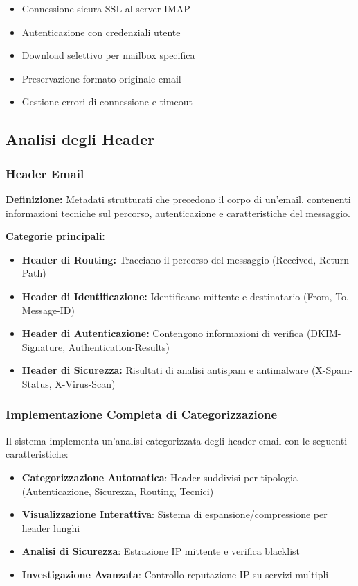 \documentclass{article}
\begin{document}
\begin{itemize}
    \item Connessione sicura SSL al server IMAP
    \item Autenticazione con credenziali utente
    \item Download selettivo per mailbox specifica
    \item Preservazione formato originale email
    \item Gestione errori di connessione e timeout
\end{itemize}

\subsection{Analisi degli Header}

\subsubsection{Header Email}
\textbf{Definizione:} Metadati strutturati che precedono il corpo di un'email, contenenti informazioni tecniche sul percorso, autenticazione e caratteristiche del messaggio.

\textbf{Categorie principali:}
\begin{itemize}
    \item \textbf{Header di Routing:} Tracciano il percorso del messaggio (Received, Return-Path)
    \item \textbf{Header di Identificazione:} Identificano mittente e destinatario (From, To, Message-ID)
    \item \textbf{Header di Autenticazione:} Contengono informazioni di verifica (DKIM-Signature, Authentication-Results)
    \item \textbf{Header di Sicurezza:} Risultati di analisi antispam e antimalware (X-Spam-Status, X-Virus-Scan)
\end{itemize}

\subsubsection{Implementazione Completa di Categorizzazione}

Il sistema implementa un'analisi categorizzata degli header email con le seguenti caratteristiche:

\begin{itemize}
    \item \textbf{Categorizzazione Automatica}: Header suddivisi per tipologia (Autenticazione, Sicurezza, Routing, Tecnici)
    \item \textbf{Visualizzazione Interattiva}: Sistema di espansione/compressione per header lunghi
    \item \textbf{Analisi di Sicurezza}: Estrazione IP mittente e verifica blacklist
    \item \textbf{Investigazione Avanzata}: Controllo reputazione IP su servizi multipli
\end{itemize}
\end{document}
